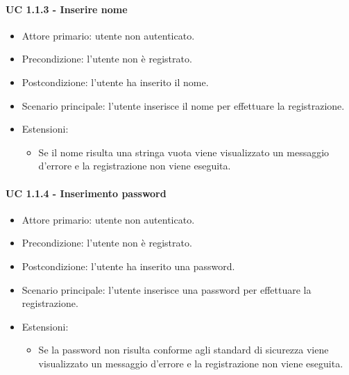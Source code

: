         \paragraph{UC 1.1.3 - Inserire nome}
            \begin{itemize}
                \item Attore primario: utente non autenticato.
                \item Precondizione: l'utente non è registrato.
                \item Postcondizione: l'utente ha inserito il nome.
                \item Scenario principale: l'utente inserisce il nome per effettuare la registrazione.
                \item Estensioni:
                    \begin{itemize}
                        \item Se il nome risulta una stringa vuota viene visualizzato un messaggio d'errore e la registrazione non viene eseguita.
                    \end{itemize}
            \end{itemize}
        \paragraph{UC 1.1.4 - Inserimento password}
            \begin{itemize}
                \item Attore primario: utente non autenticato.
                \item Precondizione: l'utente non è registrato.
                \item Postcondizione: l'utente ha inserito una password.
                \item Scenario principale: l'utente inserisce una password per effettuare la registrazione.
                \item Estensioni:
                    \begin{itemize}
                        \item Se la password non risulta conforme agli standard di sicurezza viene visualizzato un messaggio d'errore e la registrazione non viene eseguita.
                    \end{itemize}
            \end{itemize}
